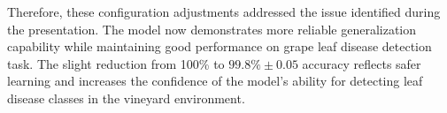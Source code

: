 \documentclass[11pt,a4paper]{article}
\begin{document}
Therefore, these configuration adjustments addressed the issue identified during the presentation. The model
now demonstrates more reliable generalization capability while maintaining good performance on grape leaf disease detection task. The slight reduction from 100\% to $99.8\%\pm0.05$ accuracy reflects safer learning and increases the confidence of the model’s ability for detecting leaf disease classes in the vineyard environment. 
\end{document}
